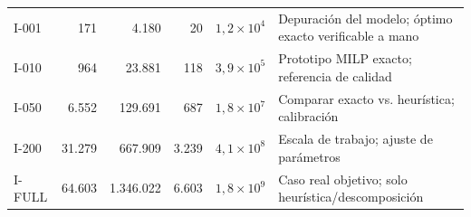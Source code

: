
\begin{tabular}{l r r r r L{3.6cm}}
 &  &  &  &  &  \\
\midrule
I-001 & 171 & 4.180 & 20 & $1{,}2\times 10^{4}$ & Depuración del modelo; óptimo exacto verificable a mano \\
I-010 & 964 & 23.881 & 118 & $3{,}9\times 10^{5}$ & Prototipo MILP exacto; referencia de calidad \\
I-050 & 6.552 & 129.691 & 687 & $1{,}8\times 10^{7}$ & Comparar exacto vs. heurística; calibración \\
I-200 & 31.279 & 667.909 & 3.239 & $4{,}1\times 10^{8}$ & Escala de trabajo; ajuste de parámetros \\
I-FULL & 64.603 & 1.346.022 & 6.603 & $1{,}8\times 10^{9}$ & Caso real objetivo; solo heurística/descomposición \\
\bottomrule
\end{tabular}

